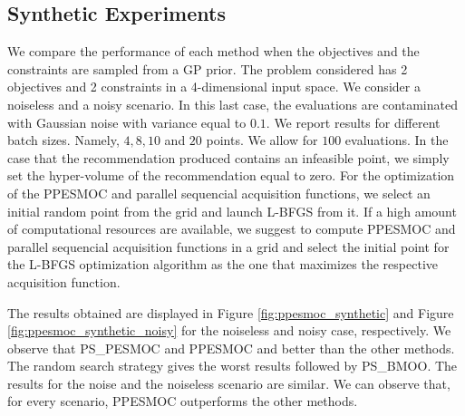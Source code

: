 \subsection{Synthetic Experiments}

We compare the performance of each method when the objectives and the 
constraints are sampled from a GP prior. The problem considered has 2 
objectives and 2 constraints in a 4-dimensional input space. 
We consider a noiseless and a noisy scenario. In this last case, the 
evaluations are contaminated with Gaussian noise with variance equal to $0.1$.
We report results for different batch sizes. Namely, $4, 8 ,10 $ and $20$ points. 
We allow for $100$ evaluations. In the case that the recommendation produced 
contains an infeasible point, we simply set the hyper-volume of 
the recommendation equal to zero. For the optimization of the PPESMOC and parallel sequencial acquisition functions, we select an initial random point from the grid and launch L-BFGS from it. If a high amount of computational resources are available, we suggest to compute PPESMOC and parallel sequencial acquisition functions in a grid and select the initial point for the L-BFGS optimization algorithm as the one that maximizes the respective acquisition function.

The results obtained are displayed in Figure \ref{fig:ppesmoc_synthetic} and  
Figure \ref{fig:ppesmoc_synthetic_noisy} for the noiseless and noisy case, 
respectively. We observe that PS\_PESMOC and PPESMOC 
and better than the other methods. 
The random search strategy gives the worst results followed by PS\_BMOO.
The results for the noise and the noiseless scenario are similar. We can observe that, for every scenario, PPESMOC outperforms the other methods.


